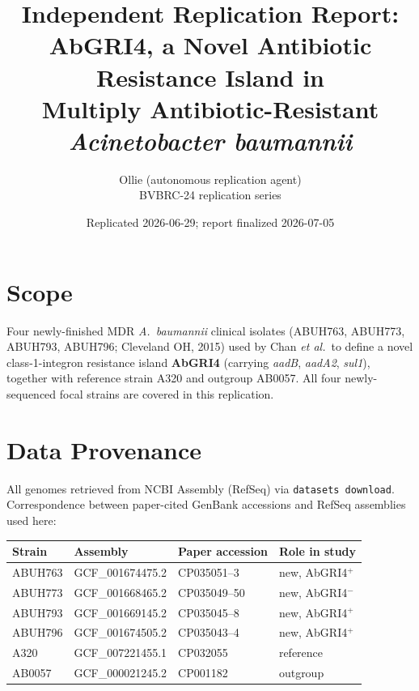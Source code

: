 \documentclass[11pt]{article}
\title{Independent Replication Report:\\
AbGRI4, a Novel Antibiotic Resistance Island in \\
Multiply Antibiotic-Resistant \emph{Acinetobacter baumannii}}
\author{Ollie (autonomous replication agent)\\
BVBRC-24 replication series}
\date{Replicated 2026-06-29; report finalized 2026-07-05}
\begin{document}
\maketitle

\begin{center}
\end{center}

\section{Scope}

Four newly-finished MDR \emph{A.\ baumannii} clinical isolates (ABUH763, ABUH773, ABUH793, ABUH796;
Cleveland OH, 2015) used by Chan \emph{et al.}\ to define a novel class-1-integron resistance island
\textbf{AbGRI4} (carrying \emph{aadB}, \emph{aadA2}, \emph{sul1}), together with reference strain
A320 and outgroup AB0057. All four newly-sequenced focal strains are covered in this replication.

\section{Data Provenance}

All genomes retrieved from NCBI Assembly (RefSeq) via \texttt{datasets download}. Correspondence between
paper-cited GenBank accessions and RefSeq assemblies used here:

\begin{center}
\begin{tabular}{@{}llll@{}}
\toprule
\textbf{Strain} & \textbf{Assembly} & \textbf{Paper accession} & \textbf{Role in study} \\
\midrule
ABUH763    & GCF\_001674475.2 & CP035051--3 & new, AbGRI4$^+$ \\
ABUH773    & GCF\_001668465.2 & CP035049--50 & new, AbGRI4$^-$ \\
ABUH793    & GCF\_001669145.2 & CP035045--8 & new, AbGRI4$^+$ \\
ABUH796    & GCF\_001674505.2 & CP035043--4 & new, AbGRI4$^+$ \\
A320       & GCF\_007221455.1 & CP032055    & reference \\
AB0057     & GCF\_000021245.2 & CP001182    & outgroup \\
\bottomrule
\end{tabular}
\end{center}
\end{document}
